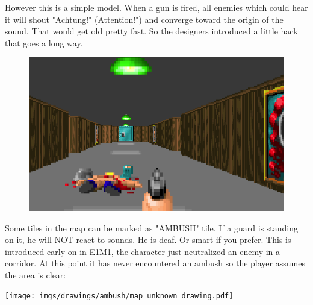 However this is a simple model. When a gun is fired, all enemies which could hear it will shout "Achtung!" (Attention!") and converge toward the origin of the sound. That would get old pretty fast. So the designers introduced a little hack that goes a long way.

\par
\begin{figure}[H]
 \centering
 \includegraphics[width=\textwidth]{screenshots/ambush/map_unknown.png}
\end{figure}
\par

\begin{minipage}{0.6\textwidth}
Some tiles in the map can be marked as "AMBUSH" tile. If a guard is standing on it, he will NOT react to sounds. He is deaf. Or smart if you prefer. This is introduced early on in E1M1, the character just neutralized an enemy in a corridor. At this point it has never encountered an ambush so the player assumes the area is clear:\\
\end{minipage}
\begin{minipage}{0.4\textwidth}
\begin{flushright}
\texttt{[image: imgs/drawings/ambush/map\_unknown\_drawing.pdf]}
\end{flushright}  
\end{minipage}
\noindent
\\


